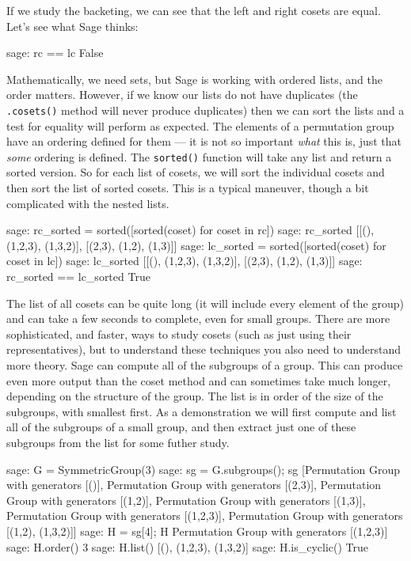 %
If we study the backeting, we can see that the left and right cosets are equal.  Let's see what Sage thinks:
%
\begin{sageexample}
sage: rc == lc
False
\end{sageexample}
%
Mathematically, we need sets, but Sage is working with ordered lists, and the order matters.  However, if we know our lists do not have duplicates (the \verb?.cosets()? method will never produce duplicates) then we can sort the lists and a test for equality will perform as expected.  The elements of a permutation group have an ordering defined for them --- it is not so important \emph{what} this is, just that \emph{some} ordering is defined.  The \verb?sorted()? function will take any list and return a sorted version.  So for each list of cosets, we will sort the individual cosets and then sort the list of sorted cosets.  This is a typical maneuver, though a bit complicated with the nested lists.
%
\begin{sageexample}
sage: rc_sorted = sorted([sorted(coset) for coset in rc])
sage: rc_sorted
[[(), (1,2,3), (1,3,2)], [(2,3), (1,2), (1,3)]]
sage: lc_sorted = sorted([sorted(coset) for coset in lc])
sage: lc_sorted
[[(), (1,2,3), (1,3,2)], [(2,3), (1,2), (1,3)]]
sage: rc_sorted == lc_sorted
True
\end{sageexample}
%
The list of all cosets can be quite long (it will include every element of the group) and can take a few seconds to complete, even for small groups.  There are more sophisticated, and faster, ways to study cosets (such as just using their representatives), but to understand these techniques you also need to understand more theory.
%
%
Sage can compute all of the subgroups of a group.  This can produce even more output than the coset method and can sometimes take much longer, depending on the structure of the group.  The list is in order of the size of the subgroups, with smallest first.  As a demonstration we will first compute and list all of the subgroups of a small group, and then extract just one of these subgroups from the list for some futher study.
%
\begin{sageexample}
sage: G = SymmetricGroup(3)
sage: sg = G.subgroups(); sg
[Permutation Group with generators [()],
 Permutation Group with generators [(2,3)],
 Permutation Group with generators [(1,2)],
 Permutation Group with generators [(1,3)],
 Permutation Group with generators [(1,2,3)],
 Permutation Group with generators [(1,2), (1,3,2)]]
sage: H = sg[4]; H
Permutation Group with generators [(1,2,3)]
sage: H.order()
3
sage: H.list()
[(), (1,2,3), (1,3,2)]
sage: H.is_cyclic()
True
\end{sageexample}

